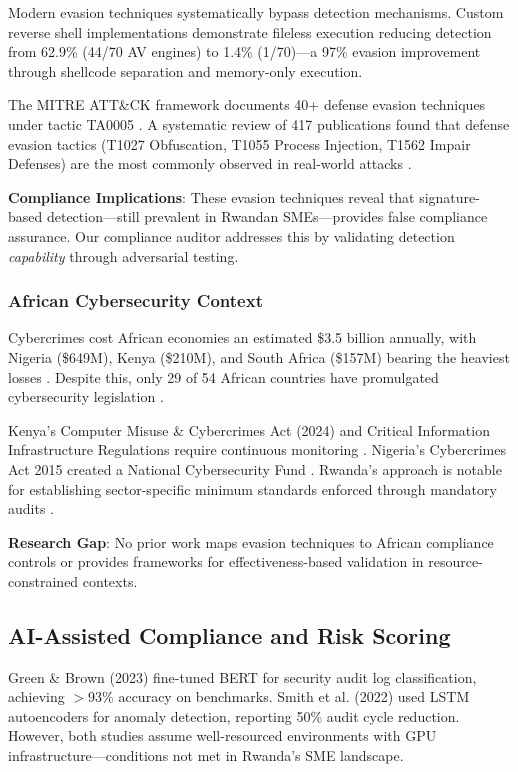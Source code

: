 \documentclass[11pt,conference]{IEEEtran}
\begin{document}
Modern evasion techniques systematically bypass detection mechanisms. Custom reverse shell implementations \cite{reverse_shell_paper} demonstrate fileless execution reducing detection from 62.9\% (44/70 AV engines) to 1.4\% (1/70)---a 97\% evasion improvement through shellcode separation and memory-only execution.

The MITRE ATT\&CK framework documents 40+ defense evasion techniques under tactic TA0005 \cite{mitre_attack_sok}. A systematic review of 417 publications found that defense evasion tactics (T1027 Obfuscation, T1055 Process Injection, T1562 Impair Defenses) are the most commonly observed in real-world attacks \cite{mitre_attack_applications}.

\textbf{Compliance Implications}: These evasion techniques reveal that signature-based detection---still prevalent in Rwandan SMEs---provides false compliance assurance. Our compliance auditor addresses this by validating detection \textit{capability} through adversarial testing.

\subsubsection{African Cybersecurity Context}

Cybercrimes cost African economies an estimated \$3.5 billion annually, with Nigeria (\$649M), Kenya (\$210M), and South Africa (\$157M) bearing the heaviest losses \cite{serianu_africa}. Despite this, only 29 of 54 African countries have promulgated cybersecurity legislation \cite{itu_africa_cyber}.

Kenya's Computer Misuse \& Cybercrimes Act (2024) and Critical Information Infrastructure Regulations require continuous monitoring \cite{kenya_cyber_law}. Nigeria's Cybercrimes Act 2015 created a National Cybersecurity Fund \cite{nigeria_cyber}. Rwanda's approach is notable for establishing sector-specific minimum standards enforced through mandatory audits \cite{ncsa2023, rwanda_strategy_2024}.

\textbf{Research Gap}: No prior work maps evasion techniques to African compliance controls or provides frameworks for effectiveness-based validation in resource-constrained contexts.

\subsection{AI-Assisted Compliance and Risk Scoring}

Green \& Brown (2023) \cite{bert_audit} fine-tuned BERT for security audit log classification, achieving $>$93\% accuracy on benchmarks. Smith et al. (2022) \cite{lstm_audit} used LSTM autoencoders for anomaly detection, reporting 50\% audit cycle reduction. However, both studies assume well-resourced environments with GPU infrastructure---conditions not met in Rwanda's SME landscape.
\end{document}
